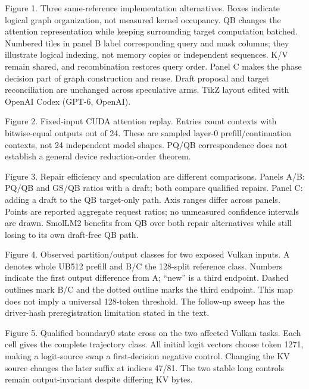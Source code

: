 Figure 1. Three same-reference implementation alternatives. Boxes indicate logical graph organization, not measured kernel occupancy. QB changes the attention representation while keeping surrounding target computation batched. Numbered tiles in panel B label corresponding query and mask columns; they illustrate logical indexing, not memory copies or independent sequences. K/V remain shared, and recombination restores query order. Panel C makes the phase decision part of graph construction and reuse. Draft proposal and target reconciliation are unchanged across speculative arms. TikZ layout edited with OpenAI Codex (GPT-6, OpenAI).

Figure 2. Fixed-input CUDA attention replay. Entries count contexts with bitwise-equal outputs out of 24. These are sampled layer-0 prefill/continuation contexts, not 24 independent model shapes. PQ/QB correspondence does not establish a general device reduction-order theorem.

Figure 3. Repair efficiency and speculation are different comparisons. Panels A/B: PQ/QB and GS/QB ratios with a draft; both compare qualified repairs. Panel C: adding a draft to the QB target-only path. Axis ranges differ across panels. Points are reported aggregate request ratios; no unmeasured confidence intervals are drawn. SmolLM2 benefits from QB over both repair alternatives while still losing to its own draft-free QB path.

Figure 4. Observed partition/output classes for two exposed Vulkan inputs. A denotes whole UB512 prefill and B/C the 128-split reference class. Numbers indicate the first output difference from A; ``new'' is a third endpoint. Dashed outlines mark B/C and the dotted outline marks the third endpoint. This map does not imply a universal 128-token threshold. The follow-up sweep has the driver-hash preregistration limitation stated in the text.

Figure 5. Qualified boundary0 state cross on the two affected Vulkan tasks. Each cell gives the complete trajectory class. All initial logit vectors choose token 1271, making a logit-source swap a first-decision negative control. Changing the KV source changes the later suffix at indices 47/81. The two stable long controls remain output-invariant despite differing KV bytes.
